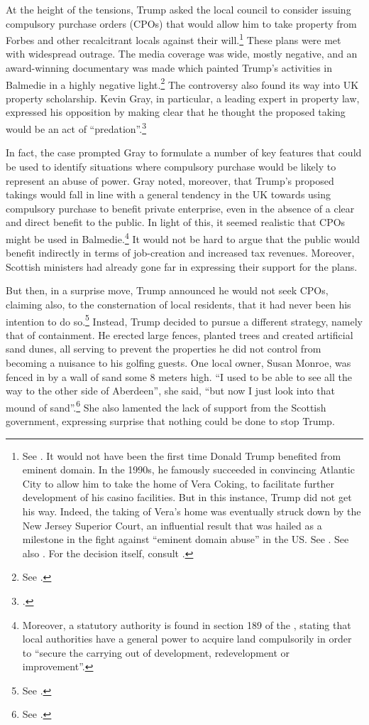 At the height of the tensions, Trump asked the local council to consider issuing compulsory purchase orders (CPOs) that would allow him to take property from Forbes and other recalcitrant locals against their will.\footnote{See \cite{macaskill09}. It would not have been the first time Donald Trump benefited from eminent domain. In the 1990s, he famously succeeded in convincing Atlantic City to allow him to take the home of Vera Coking, to facilitate further development of his casino facilities. But in this instance, Trump did not get his way. Indeed, the taking of Vera's home was eventually struck down by the New Jersey Superior Court, an influential result that was hailed as a milestone in the fight against ``eminent domain abuse'' in the US. See \cite[297-301]{jones00}. See also \cite{gillespie08}. For the decision itself, consult \cite{banin98}.} These plans were met with widespread outrage. The media coverage was wide, mostly negative, and an award-winning documentary was made which painted Trump's activities in Balmedie in a highly negative light.\footnote{See \cite{baxter11}.} The controversy also found its way into UK property scholarship. Kevin Gray, in particular, a leading expert in property law, expressed his opposition by making clear that he thought the proposed taking would be an act of ``predation''.\footcite{gray11}

In fact, the case prompted Gray to formulate a number of key features that could be used to identify situations where compulsory purchase would be likely to represent an abuse of power. Gray noted, moreover, that Trump's proposed takings would fall in line with a general tendency in the UK towards using compulsory purchase to benefit private enterprise, even in the absence of a clear and direct benefit to the public. In light of this, it seemed realistic that CPOs might be used in Balmedie.\footnote{Moreover, a statutory authority is found in section 189 of the \cite{tcpsa97}, stating that local authorities have a general power to acquire land compulsorily in order to ``secure the carrying out of development, redevelopment or improvement''.} It would not be hard to argue that the public would benefit indirectly in terms of job-creation and increased tax revenues. Moreover, Scottish ministers had already gone far in expressing their support for the plans.

But then, in a surprise move, Trump announced he would not seek CPOs, claiming also, to the consternation of local residents, that it had never been his intention to do so.\footnote{See \cite{scotsman11}.} Instead, Trump decided to pursue a different strategy, namely that of containment. He erected large fences, planted trees and created artificial sand dunes, all serving to prevent the properties he did not control from becoming a nuisance to his golfing guests. One local owner, Susan Monroe, was fenced in by a wall of sand some 8 meters high. ``I used to be able to see all the way to the other side of Aberdeen'', she said, ``but now I just look into that mound of sand''.\footnote{See \cite{booth12}.} She also lamented the lack of support from the Scottish government, expressing surprise that nothing could be done to stop Trump.


